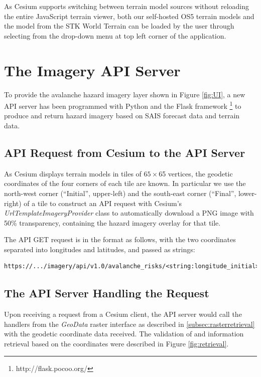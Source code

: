 \documentclass[11pt, oneside]{article}
\begin{document}
{		As Cesium supports switching between terrain model sources without reloading the entire JavaScript terrain viewer, both our self-hosted OS5 terrain models and the model from the STK World Terrain can be loaded by the user through selecting from the drop-down menu at top left corner of the application. 
		
\section{The Imagery API Server} \label{sec:APIServer}
	
	To provide the avalanche hazard imagery layer shown in Figure \ref{fig:UI}, a new API server has been programmed with Python and the Flask framework \footnote{http://flask.pocoo.org/} to produce and return hazard imagery based on SAIS forecast data and terrain data.
	
	\subsection{API Request from Cesium to the API Server}
		As Cesium displays terrain models in tiles of $65 \times $65 vertices, the geodetic coordinates of the four corners of each tile are known. In particular we use the north-west corner (``Initial'', upper-left) and the south-east corner (``Final'', lower-right) of a tile to construct an API request with Cesium's \textit{UrlTemplateImageryProvider} \cite{urltemplate} class to automatically download a PNG image with 50\% transparency, containing the hazard imagery overlay for that tile.
		
		The API GET request is in the format as follows, with the two coordinates separated into longitudes and latitudes, and passed as strings:
		\begin{lstlisting}[breaklines]
https://.../imagery/api/v1.0/avalanche_risks/<string:longitude_initial>/<string:latitude_initial>/<string:longitude_final>/<string:latitude_final>
		\end{lstlisting}
	
	\subsection{The API Server Handling the Request}
		Upon receiving a request from a Cesium client, the API server would call the handlers from the \textit{GeoData} raster interface as described in \ref{subsec:rasterretrieval} with the geodetic coordinate data received. The validation of and information retrieval based on the coordinates were described in Figure \ref{fig:retrieval}.
		
}
\end{document}
